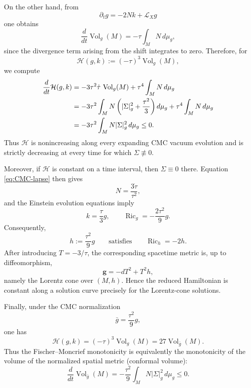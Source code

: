 \documentclass{amsart}
\begin{document}
\noindent On the other hand, from
\[
        \partial_t g=-2Nk+\mathcal L_Xg
\]
one obtains
\[
        \frac{d}{dt}\operatorname{Vol}_g(M)
        =
        -\tau\int_M N\,d\mu_g,
\]
since the divergence term arising from the shift integrates to zero.
Therefore, for
\[
        \mathcal H(g,k)
        :=
        (-\tau)^3\operatorname{Vol}_g(M),
\]
we compute
\begin{align}
        \frac{d}{dt}\mathcal H(g,k)
        &=
        -3\tau^2\dot\tau\,\operatorname{Vol}_g(M)
        +
        \tau^4\int_M N\,d\mu_g \notag\\
        &=
        -3\tau^2
        \int_M N
        \left(
        |\Sigma|_g^2+\frac{\tau^2}{3}
        \right)d\mu_g
        +
        \tau^4\int_M N\,d\mu_g \notag\\
        &=
        -3\tau^2
        \int_M N|\Sigma|_g^2\,d\mu_g
        \leq0.
\label{eq:reduced-Hamiltonian-monotonicity}
\end{align}
Thus \(\mathcal H\) is nonincreasing along every expanding CMC vacuum
evolution and is strictly decreasing at every time for which
\(\Sigma\not\equiv0\).

\noindent Moreover, if \(\mathcal H\) is constant on a time interval, then
\(\Sigma\equiv0\) there. Equation \eqref{eq:CMC-lapse} then gives
\[
        N=\frac{3\dot\tau}{\tau^2},
\]
and the Einstein evolution equations imply
\[
        k=\frac{\tau}{3}g,
        \qquad
        \operatorname{Ric}_g=-\frac{2\tau^2}{9}g.
\]
Consequently,
\[
        h:=\frac{\tau^2}{9}g
        \qquad\text{satisfies}\qquad
        \operatorname{Ric}_h=-2h.
\]
After introducing \(T=-3/\tau\), the corresponding spacetime metric is,
up to diffeomorphism,
\[
        \mathbf g=-dT^2+T^2h,
\]
namely the Lorentz cone over \((M,h)\). Hence the reduced Hamiltonian is
constant along a solution curve precisely for the Lorentz-cone
solutions.


\noindent Finally, under the CMC normalization
\[
        \bar g=\frac{\tau^2}{9}g,
\]
one has
\[
        \mathcal H(g,k)
        =
        (-\tau)^3\operatorname{Vol}_g(M)
        =
        27\operatorname{Vol}_{\bar g}(M).
\]
Thus the Fischer--Moncrief monotonicity is equivalently the
monotonicity of the volume of the normalized spatial metric (conformal volume):
\[
        \frac{d}{dt}\operatorname{Vol}_{\bar g}(M)
        =
        -\frac{\tau^2}{9}
        \int_M N|\Sigma|_g^2\,d\mu_g
        \leq0.
\]
\end{document}
